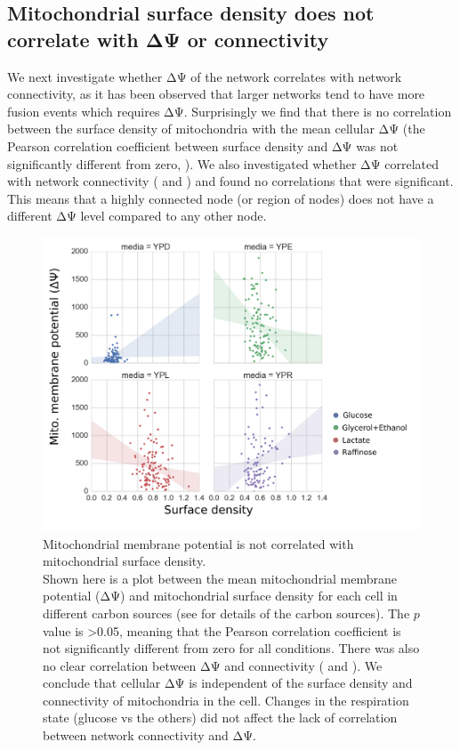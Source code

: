 \subsection{Mitochondrial surface density does not correlate with ΔΨ or connectivity}
We next investigate whether ΔΨ of the network correlates with network connectivity, as it has been observed that larger networks tend to have more fusion events \cite{jakobs_spatial_2003} which requires ΔΨ. Surprisingly we find that there is no correlation between the surface density of mitochondria with the mean cellular ΔΨ (the Pearson correlation coefficient between surface density and ΔΨ was not significantly different from zero, ). We also investigated whether ΔΨ correlated with network connectivity ( and ) and found no correlations that were significant. This means that a highly connected node (or region of nodes) does not have a different ΔΨ level compared to any other node.
%
\begin{figure}[htp]
	\centering
    \hspace*{.5in}\includegraphics[width=.9\textwidth]{dydense}
    \caption[Mitochondrial membrane potential is not correlated with mitochondrial surface density]{Mitochondrial membrane potential is not correlated with mitochondrial surface density.\\Shown here is a plot between the mean mitochondrial membrane potential (ΔΨ) and mitochondrial surface density for each cell in different carbon sources (see  for details of the carbon sources). The $p$ value is >0.05, meaning that the Pearson correlation coefficient is not significantly different from zero for all conditions. There was also no clear correlation between ΔΨ and connectivity ( and ). We conclude that cellular ΔΨ is independent of the surface density and connectivity of mitochondria in the cell. Changes in the respiration state (glucose vs the others) did not affect the lack of correlation between network connectivity and ΔΨ.}\label{fig:dydense}
\end{figure}
%

